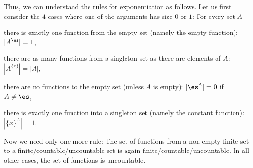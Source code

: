 Thus, we can understand the rules for exponentiation as follows.
Let us first consider the $4$ cases where one of the arguments has size $0$ or $1$: For every set $A$
\begin{compactenum}
\item there is exactly one function from the empty set (namely the empty function): $|A^\es|=1$,
\item there are as many functions from a singleton set as there are elements of $A$: $|A^{\{x\}}|=|A|$,
\item there are no functions to the empty set (unless $A$ is empty): $|\es^A|=0$ if $A\neq\es$,
\item there is exactly one function into a singleton set (namely the constant function): $|\{x\}^A|=1$,
\end{compactenum}

Now we need only one more rule: The set of functions from a non-empty finite set to a finite/countable/uncountable set is again finite/countable/uncountable.
In all other cases, the set of functions is uncountable.
